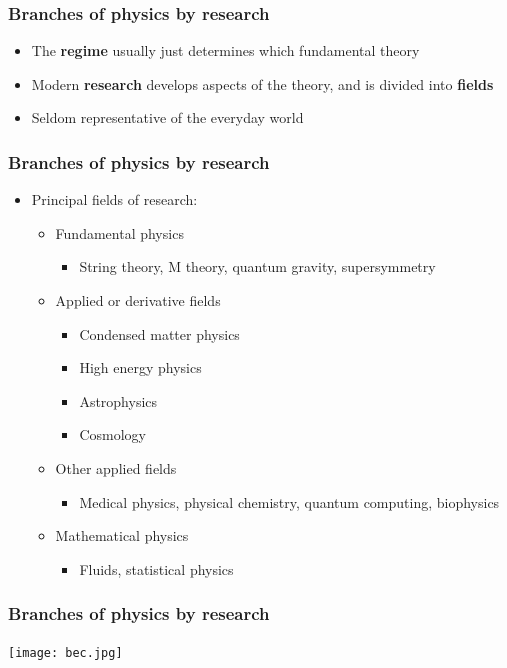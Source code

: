 \documentclass{beamer}
\begin{document}
\begin{frame}
\frametitle{Branches of physics by research}
\begin{itemize}
  \item<1-> The \textbf{regime} usually just determines which fundamental theory
  \item<2-> Modern \textbf{research} develops aspects of the theory, and is divided into \textbf{fields}
  \item<3-> Seldom representative of the everyday world
\end{itemize}
\end{frame}

\begin{frame}
\frametitle{Branches of physics by research}
\begin{itemize}
  \item<1-> Principal fields of research:
    \begin{itemize}
      \item<2-> Fundamental physics
	\begin{itemize}
	  \item<3-> String theory, M theory, quantum gravity, supersymmetry
	\end{itemize}
      \item<4-> Applied or derivative fields
	\begin{itemize}
	  \item<5-> Condensed matter physics
	  \item<6-> High energy physics
	  \item<7-> Astrophysics
	  \item<8-> Cosmology
	\end{itemize}
      \item<9-> Other applied fields
	\begin{itemize}
	  \item<10-> Medical physics, physical chemistry, quantum computing, biophysics
	\end{itemize}
      \item<11-> Mathematical physics
	\begin{itemize}
	  \item<12-> Fluids, statistical physics
	\end{itemize}
    \end{itemize}
\end{itemize}
\end{frame}

\begin{frame}
  \center
  \frametitle{Branches of physics by research}
  \texttt{[image: bec.jpg]}
\end{frame}
\end{document}
